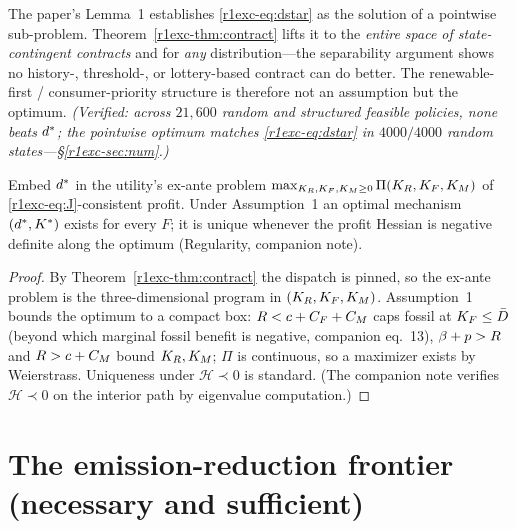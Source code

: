 \begin{remark}
The paper's Lemma~1 establishes \eqref{r1exc-eq:dstar} as the solution of a pointwise
sub-problem. Theorem~\ref{r1exc-thm:contract} lifts it to the \emph{entire space of
state-contingent contracts} and for \emph{any} distribution---the separability
argument shows no history-, threshold-, or lottery-based contract can do better.
The renewable-first / consumer-priority structure is therefore not an assumption
but the optimum. \emph{(Verified: across $21{,}600$ random and structured feasible
policies, none beats $d^{*}$; the pointwise optimum matches \eqref{r1exc-eq:dstar} in
$4000/4000$ random states---\S\ref{r1exc-sec:num}.)}
\end{remark}

\begin{theorem}\label{r1exc-thm:exante}
Embed $d^{*}$ in the utility's ex-ante problem
$\max_{K_R,K_F,K_M\ge0}\Pi(K_R,K_F,K_M)$ of \eqref{r1exc-eq:J}-consistent profit. Under
Assumption~1 an optimal mechanism $(d^{*},K^{*})$ exists for every $F$; it is
unique whenever the profit Hessian is negative definite along the optimum
(Regularity, companion note).
\end{theorem}

\begin{proof}
By Theorem~\ref{r1exc-thm:contract} the dispatch is pinned, so the ex-ante problem is
the three-dimensional program in $(K_R,K_F,K_M)$. Assumption~1 bounds the optimum
to a compact box: $R<c+C_F+C_M$ caps fossil at $K_F\le\bar D$ (beyond which
marginal fossil benefit is negative, companion eq.\ 13), $\beta+p>R$ and $R>c+C_M$
bound $K_R,K_M$; $\Pi$ is continuous, so a maximizer exists by Weierstrass.
Uniqueness under $\mathcal H\prec0$ is standard. (The companion note verifies
$\mathcal H\prec0$ on the interior path by eigenvalue computation.)
\end{proof}

\section{The emission-reduction frontier (necessary and sufficient)}\label{r1exc-sec:ns}


